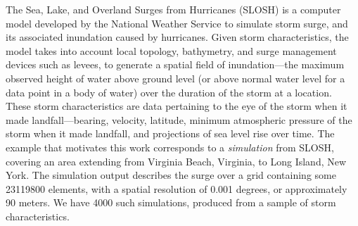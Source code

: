 The Sea, Lake, and Overland Surges from Hurricanes (SLOSH)\citep{jelesnianski1992} is a 
    computer model developed by the National Weather Service to simulate storm 
    surge, and its associated inundation caused by hurricanes.   Given storm 
    characteristics, the model takes into account local topology, bathymetry, 
    and surge management devices such as levees, to generate a spatial field of 
    inundation---the maximum observed height of water above ground level 
    (or above normal water level for a data point in a body of water) over the 
    duration of the storm at a location.   These storm characteristics are
    data pertaining to the eye of the storm when it made landfall---bearing, 
    velocity, latitude, minimum atmospheric pressure of the storm when it 
    made landfall, and projections of sea level rise over time.  The example that motivates
    this work corresponds to a \emph{simulation} from SLOSH, covering an area extending 
    from Virginia Beach, Virginia, to Long Island, New York.
    The simulation output describes the surge over a grid containing some \num{23119800} 
    elements, with a spatial resolution of \num{0.001} degrees, or approximately 90 
    meters.   We have \num{4000} such simulations, produced from a sample of 
    storm characteristics. 

